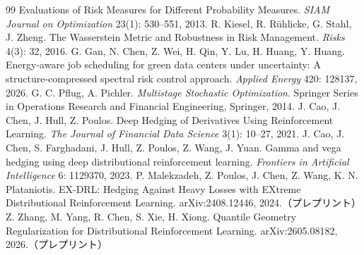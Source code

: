 \documentclass[a4paper,10pt]{jsarticle}
\theoremstyle{definition}
\begin{document}
\begin{thebibliography}{99}
Evaluations of Risk Measures for Different Probability Measures. \textit{SIAM Journal on Optimization} 23(1): 530--551, 2013.
 R. Kiesel, R. R{\"u}hlicke, G. Stahl, J. Zheng.
The Wasserstein Metric and Robustness in Risk Management. \textit{Risks} 4(3): 32, 2016.
 G. Gan, N. Chen, Z. Wei, H. Qin, Y. Lu, H. Huang, Y. Huang.
Energy-aware job scheduling for green data centers under uncertainty: A structure-compressed spectral risk control approach. \textit{Applied Energy} 420: 128137, 2026.
 G. C. Pflug, A. Pichler.
\textit{Multistage Stochastic Optimization}. Springer Series in Operations Research and Financial Engineering, Springer, 2014.
 J. Cao, J. Chen, J. Hull, Z. Poulos.
Deep Hedging of Derivatives Using Reinforcement Learning. \textit{The Journal of Financial Data Science} 3(1): 10--27, 2021.
 J. Cao, J. Chen, S. Farghadani, J. Hull, Z. Poulos, Z. Wang, J. Yuan.
Gamma and vega hedging using deep distributional reinforcement learning. \textit{Frontiers in Artificial Intelligence} 6: 1129370, 2023.
 P. Malekzadeh, Z. Poulos, J. Chen, Z. Wang, K. N. Plataniotis.
EX-DRL: Hedging Against Heavy Losses with EXtreme Distributional Reinforcement Learning. arXiv:2408.12446, 2024.（プレプリント）
 Z. Zhang, M. Yang, R. Chen, S. Xie, H. Xiong.
Quantile Geometry Regularization for Distributional Reinforcement Learning. arXiv:2605.08182, 2026.（プレプリント）
\end{thebibliography}
\end{document}
